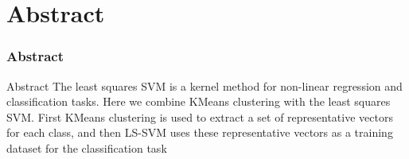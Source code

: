 \documentclass{beamer}
\begin{document}
\section{Abstract}
\begin{frame}[fragile]
\frametitle{Abstract}
\begin{block}{Abstract}
The least squares SVM is a kernel method for non-linear regression and classification tasks.
        Here we combine KMeans clustering with the least squares SVM. First KMeans clustering is used to extract a set of representative vectors for each class, and then LS-SVM uses these representative vectors as a training dataset for the classification task
\end{block}

\end{frame}
\end{document}
